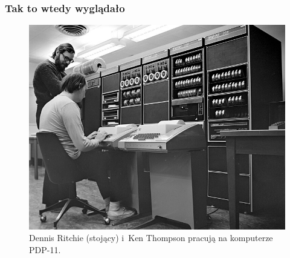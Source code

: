 \documentclass[10pt,t]{beamer}
\begin{document}
\begin{frame}
  \frametitle{Tak to wtedy wyglądało}


  \begin{figure}

    \centering


    \includegraphics[scale=0.3]
    {./PresentationsPictures/OS-heroes-Pictures/Dennis-Ritchie-Ken-Thompson-PDP-11.jpg}

    \caption{Dennis Ritchie (stojący) i~Ken Thompson pracują na komputerze
      PDP-11.}

    \label{fig:Ritchie-Thompson-PDP-11}

  \end{figure}

\end{frame}
\end{document}
